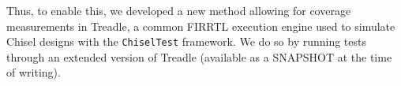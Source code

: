 \documentclass[conference]{IEEEtran}
\begin{document}
Thus, to enable this, we developed a new method allowing for coverage measurements in Treadle, a common FIRRTL execution engine used to simulate Chisel designs with the \texttt{ChiselTest} framework. We do so by running tests through an extended version of Treadle (available as a SNAPSHOT at the time of writing).%
\end{document}
